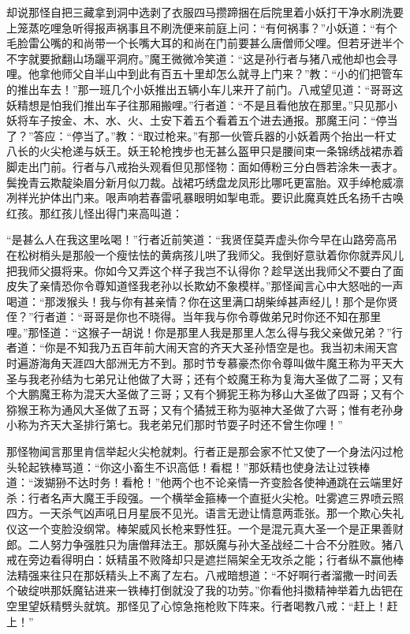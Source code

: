 \documentclass[12pt,UTF8]{ctexbook}
\begin{document}
却说那怪自把三藏拿到洞中选剥了衣服四马攒蹄捆在后院里着小妖打干净水刷洗要上笼蒸吃哩急听得报声祸事且不刷洗便来前庭上问：“有何祸事？”小妖道：“有个毛脸雷公嘴的和尚带一个长嘴大耳的和尚在门前要甚么唐僧师父哩。但若牙迸半个不字就要掀翻山场躧平洞府。”魔王微微冷笑道：“这是孙行者与猪八戒他却也会寻哩。他拿他师父自半山中到此有百五十里却怎么就寻上门来？”教：“小的们把管车的推出车去！”那一班几个小妖推出五辆小车儿来开了前门。八戒望见道：“哥哥这妖精想是怕我们推出车子往那厢搬哩。”行者道：“不是且看他放在那里。”只见那小妖将车子按金、木、水、火、土安下着五个看着五个进去通报。那魔王问：“停当了？”答应：“停当了。”教：“取过枪来。”有那一伙管兵器的小妖着两个抬出一杆丈八长的火尖枪递与妖王。妖王轮枪拽步也无甚么盔甲只是腰间束一条锦绣战裙赤着脚走出门前。行者与八戒抬头观看但见那怪物：面如傅粉三分白唇若涂朱一表才。鬓挽青云欺靛染眉分新月似刀裁。战裙巧绣盘龙凤形比哪吒更富胎。双手绰枪威凛冽祥光护体出门来。哏声响若春雷吼暴眼明如掣电乖。要识此魔真姓氏名扬千古唤红孩。那红孩儿怪出得门来高叫道：

“是甚么人在我这里吆喝！”行者近前笑道：“我贤侄莫弄虚头你今早在山路旁高吊在松树梢头是那般一个瘦怯怯的黄病孩儿哄了我师父。我倒好意驮着你你就弄风儿把我师父摄将来。你如今又弄这个样子我岂不认得你？趁早送出我师父不要白了面皮失了亲情恐你令尊知道怪我老孙以长欺幼不象模样。”那怪闻言心中大怒咄的一声喝道：“那泼猴头！我与你有甚亲情？你在这里满口胡柴绰甚声经儿！那个是你贤侄？”行者道：“哥哥是你也不晓得。当年我与你令尊做弟兄时你还不知在那里哩。”那怪道：“这猴子一胡说！你是那里人我是那里人怎么得与我父亲做兄弟？”行者道：“你是不知我乃五百年前大闹天宫的齐天大圣孙悟空是也。我当初未闹天宫时遍游海角天涯四大部洲无方不到。那时节专慕豪杰你令尊叫做牛魔王称为平天大圣与我老孙结为七弟兄让他做了大哥；还有个蛟魔王称为复海大圣做了二哥；又有个大鹏魔王称为混天大圣做了三哥；又有个狮狔王称为移山大圣做了四哥；又有个猕猴王称为通风大圣做了五哥；又有个獝狨王称为驱神大圣做了六哥；惟有老孙身小称为齐天大圣排行第七。我老弟兄们那时节耍子时还不曾生你哩！”

那怪物闻言那里肯信举起火尖枪就刺。行者正是那会家不忙又使了一个身法闪过枪头轮起铁棒骂道：“你这小畜生不识高低！看棍！”那妖精也使身法让过铁棒道：“泼猢狲不达时务！看枪！”他两个也不论亲情一齐变脸各使神通跳在云端里好杀：行者名声大魔王手段强。一个横举金箍棒一个直挺火尖枪。吐雾遮三界喷云照四方。一天杀气凶声吼日月星辰不见光。语言无逊让情意两乖张。那一个欺心失礼仪这一个变脸没纲常。棒架威风长枪来野性狂。一个是混元真大圣一个是正果善财郎。二人努力争强胜只为唐僧拜法王。那妖魔与孙大圣战经二十合不分胜败。猪八戒在旁边看得明白：妖精虽不败降却只是遮拦隔架全无攻杀之能；行者纵不赢他棒法精强来往只在那妖精头上不离了左右。八戒暗想道：“不好啊行者溜撒一时间丢个破绽哄那妖魔钻进来一铁棒打倒就没了我的功劳。”你看他抖擞精神举着九齿钯在空里望妖精劈头就筑。那怪见了心惊急拖枪败下阵来。行者喝教八戒：“赶上！赶上！”
\end{document}
